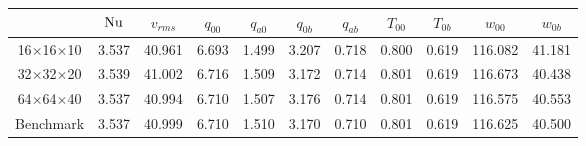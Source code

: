 \begin{tabular}{c|cccccccccc}
    & $\mathrm{Nu}$ & $v_{rms}$ & $q_{00}$ & $q_{a0}$ &  $q_{0b}$ &$q_{ab}$ & $T_{00}$ & $T_{0b}$ & $w_{00}$ & $w_{0b}$ \\
\hline
16$\times$16$\times$10 & 3.537 & 40.961 & 6.693 & 1.499 & 3.207 & 0.718 &0.800 & 0.619 &116.082 & 41.181 \\
32$\times$32$\times$20 & 3.539 & 41.002 & 6.716 & 1.509 & 3.172 & 0.714 &0.801 & 0.619 &116.673 & 40.438 \\
64$\times$64$\times$40 & 3.537 & 40.994 & 6.710 & 1.507 & 3.176 & 0.714 &0.801 & 0.619 &116.575 & 40.553 \\
\hline
Benchmark & 3.537 & 40.999 & 6.710 & 1.510 & 3.170 & 0.710 &0.801 & 0.619 &116.625 & 40.500 \\
\end{tabular}
